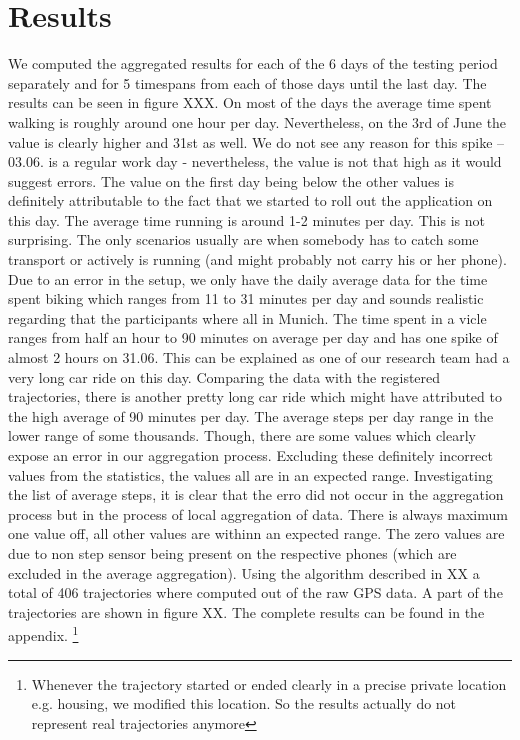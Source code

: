 \section{Results}
We computed the aggregated results for each of the 6 days of the testing period separately and for 5 timespans from each of those days until the last day. The results can be seen in figure XXX. 
On most of the days the average time spent walking is roughly around one hour per day. Nevertheless, on the 3rd of June the value is clearly higher and 31st as well. We do not see any reason for this spike -- 03.06. is a regular work day - nevertheless, the value is not that high as it would suggest errors. The value on the first day being below the other values is definitely attributable to the fact that we started to roll out the application on this day.
The average time running is around 1-2 minutes per day. This is not surprising. The only scenarios usually are when somebody has to catch some transport or actively is running (and might probably not carry his or her phone).
Due to an error in the setup, we only have the daily average data for the time spent biking which ranges from 11 to 31 minutes per day and sounds realistic regarding that the participants where all in Munich.
The time spent in a  vicle ranges from half an hour to 90 minutes on average per day and has one spike of almost 2 hours on 31.06. This can be explained as one of our research team had a very long car ride on this day. Comparing the data with the registered trajectories, there is another pretty long car ride which might have attributed to the high average of 90 minutes per day. 
The average steps per day range in the lower range of some thousands. Though, there are some values which clearly expose an error in our aggregation process. Excluding these definitely incorrect values from the statistics, the values all are in an expected range. 
Investigating the list of average steps, it is clear that the erro did not occur in the aggregation process but in the process of local aggregation of data. There is always maximum one value off, all other values are withinn an expected range. The zero values are due to non step sensor being present on the respective phones (which are excluded in the average aggregation).
Using the algorithm described in XX a total of 406 trajectories where computed out of the raw GPS data. A part of the trajectories are shown in figure XX. The complete results can be found in the appendix. \footnote{Whenever the trajectory started or ended clearly in a precise private location e.g. housing, we modified this location. So the results actually do not represent real trajectories anymore}

